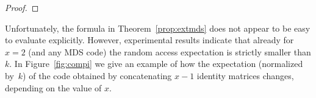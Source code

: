 \documentclass[11pt,a4paper,reqno,twoside]{amsart}
\theoremstyle{definition}
\newcommand{\E}{\mathbb{E}}
\newcommand{\mS}{\mathcal{S}}
\begin{document}
\begin{proof}
\end{proof}


Unfortunately, the formula in Theorem~\ref{prop:extmds} does not appear to be easy to evaluate explicitly. However, experimental results indicate that already for $x=2$ (and any MDS code) the random access expectation is strictly smaller than $k$. In Figure~\ref{fig:compi} we give an example of how the  expectation (normalized by~$k$) of the code obtained by concatenating $x-1$ identity matrices changes, depending on the value of $x$. 
\end{document}
